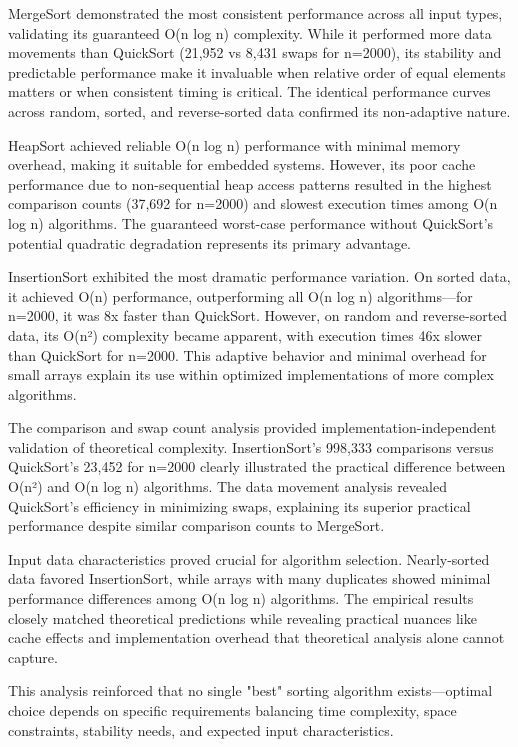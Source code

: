 \documentclass[12pt]{article}
\begin{document}
MergeSort demonstrated the most consistent performance across all input types, validating its guaranteed O(n log n) complexity. While it performed more data movements than QuickSort (21,952 vs 8,431 swaps for n=2000), its stability and predictable performance make it invaluable when relative order of equal elements matters or when consistent timing is critical. The identical performance curves across random, sorted, and reverse-sorted data confirmed its non-adaptive nature.

HeapSort achieved reliable O(n log n) performance with minimal memory overhead, making it suitable for embedded systems. However, its poor cache performance due to non-sequential heap access patterns resulted in the highest comparison counts (37,692 for n=2000) and slowest execution times among O(n log n) algorithms. The guaranteed worst-case performance without QuickSort's potential quadratic degradation represents its primary advantage.

InsertionSort exhibited the most dramatic performance variation. On sorted data, it achieved O(n) performance, outperforming all O(n log n) algorithms—for n=2000, it was 8x faster than QuickSort. However, on random and reverse-sorted data, its O(n²) complexity became apparent, with execution times 46x slower than QuickSort for n=2000. This adaptive behavior and minimal overhead for small arrays explain its use within optimized implementations of more complex algorithms.

The comparison and swap count analysis provided implementation-independent validation of theoretical complexity. InsertionSort's 998,333 comparisons versus QuickSort's 23,452 for n=2000 clearly illustrated the practical difference between O(n²) and O(n log n) algorithms. The data movement analysis revealed QuickSort's efficiency in minimizing swaps, explaining its superior practical performance despite similar comparison counts to MergeSort.

Input data characteristics proved crucial for algorithm selection. Nearly-sorted data favored InsertionSort, while arrays with many duplicates showed minimal performance differences among O(n log n) algorithms. The empirical results closely matched theoretical predictions while revealing practical nuances like cache effects and implementation overhead that theoretical analysis alone cannot capture.

This analysis reinforced that no single "best" sorting algorithm exists—optimal choice depends on specific requirements balancing time complexity, space constraints, stability needs, and expected input characteristics.
\end{document}
